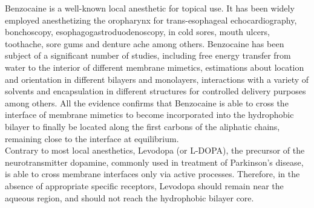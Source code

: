 \documentclass[3p,preprint,review]{elsarticle}
\begin{document}
	
	Benzocaine is a well-known local anesthetic for topical use. It has been widely
	employed anesthetizing the oropharynx for trans-esophageal echocardiography,
	bonchoscopy, esophagogastroduodenoscopy, in cold sores, mouth ulcers,
	toothache,
	sore gums and denture ache among others\cite{McEvoy2007}.
	Benzocaine has been subject of a significant number of studies, including free
	energy transfer from water to the interior of different membrane
	mimetics\cite{Martin2014a,Cascales2011,Porasso2009,J.J.LopezCascales2006},
	estimations about location and orientation in different bilayers and
	monolayers\cite{Matsuki2001,Suwalsky2004,Kuroda2000,Choi2001}, interactions
	with
	a variety of
	solvents\cite{Cardenas2016,Cardenas2018,Paluch2015,Avila2002,Aguado2013} and
	encapsulation in different structures for controlled delivery
	purposes\cite{Shkurenko2018,AttouiYahia2017,Li2016,Arantes2014,Puglia2011}
	among
	others. All the evidence confirms that Benzocaine is able to cross the
	interface
	of membrane mimetics to become incorporated into the
	hydrophobic bilayer to finally be located along the first carbons of the
  aliphatic chains, remaining close to the interface at equilibrium. \\
	Contrary to most local anesthetics, Levodopa (or L-DOPA), the precursor of the
	neurotransmitter dopamine, commonly used in treatment of Parkinson's
	disease\cite{Fabbrini1987},
	is
	able to cross membrane interfaces only via active
	processes\cite{BENTLEY2012349,PRYOR2013180}.
	Therefore, in the absence of appropriate specific receptors, Levodopa should
	remain near the aqueous region, and should not reach the hydrophobic
	bilayer core\cite{Orowski2012}.\\
	
\end{document}
